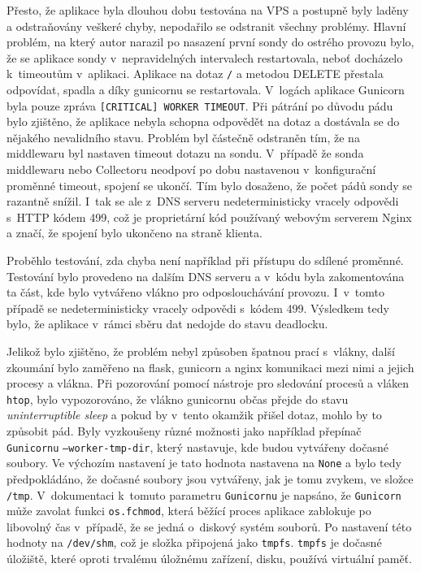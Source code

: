 \documentclass[thesis=M,czech]{src/FITthesis}[2019/12/23]
\begin{document}
Přesto, že aplikace byla dlouhou dobu testována na VPS a postupně byly laděny a odstraňovány veškeré chyby, nepodařilo se odstranit všechny problémy. Hlavní problém, na který autor narazil po nasazení první sondy do ostrého provozu bylo, že se aplikace sondy v~nepravidelných intervalech restartovala, neboť docházelo k~timeoutům v~aplikaci. Aplikace na dotaz \texttt{/} a metodou DELETE přestala odpovídat, spadla a díky gunicornu se restartovala. V~logách aplikace Gunicorn byla pouze zpráva \texttt{[CRITICAL] WORKER TIMEOUT}. Při pátrání po důvodu pádu bylo zjištěno, že aplikace nebyla schopna odpovědět na dotaz a dostávala se do nějakého nevalidního stavu. Problém byl částečně odstraněn tím, že na middlewaru byl nastaven timeout dotazu na sondu. V~případě že sonda middlewaru nebo Collectoru neodpoví po dobu nastavenou v~konfigurační proměnné timeout, spojení se ukončí. Tím bylo dosaženo, že počet pádů sondy se razantně snížil. I~tak se ale z~DNS serveru nedeterministicky vracely odpovědi s~HTTP kódem 499, což je proprietární kód používaný webovým serverem Nginx a značí, že spojení bylo ukončeno na straně klienta.

Proběhlo testování, zda chyba není například při přístupu do sdílené \linebreak proměnné. Testování bylo provedeno na dalším DNS serveru a v~kódu byla zakomentována ta část, kde bylo vytvářeno vlákno pro odposlouchávání provozu. I~v~tomto případě se nedeterministicky vracely odpovědi s~kódem 499. Výsledkem tedy bylo, že aplikace v~rámci sběru dat nedojde do stavu deadlocku. 

Jelikož bylo zjištěno, že problém nebyl způsoben špatnou prací s~vlákny, další zkoumání bylo zaměřeno na flask, gunicorn a nginx komunikaci mezi nimi a jejich procesy a vlákna. Při pozorování pomocí nástroje pro sledování procesů a vláken \texttt{htop}, bylo vypozorováno, že vlákno gunicornu občas přejde do stavu \textit{uninterruptible sleep} a pokud by v~tento okamžik přišel dotaz, mohlo by to způsobit pád. Byly vyzkoušeny různé možnosti jako například přepínač \texttt{Gunicornu} \texttt{--worker-tmp-dir}, který nastavuje, kde budou vytvářeny dočasné soubory. Ve výchozím nastavení je tato hodnota nastavena na \texttt{None} a bylo tedy předpokládáno, že dočasné soubory jsou vytvářeny, jak je tomu zvykem, ve složce \texttt{/tmp}. V~dokumentaci k~tomuto parametru \texttt{Gunicornu} je napsáno, že \texttt{Gunicorn} může zavolat funkci \texttt{os.fchmod}, která běžící proces aplikace zablokuje po libovolný čas v~případě, že se jedná o~diskový systém souborů. Po nastavení této hodnoty na \texttt{/dev/shm}, což je složka připojená jako \texttt{tmpfs}. \texttt{tmpfs} je dočasné úložiště, které oproti trvalému úložnému zařízení, disku, používá virtuální paměť. \cite{gunicorn-doc, uwsgi-doc}
\end{document}
